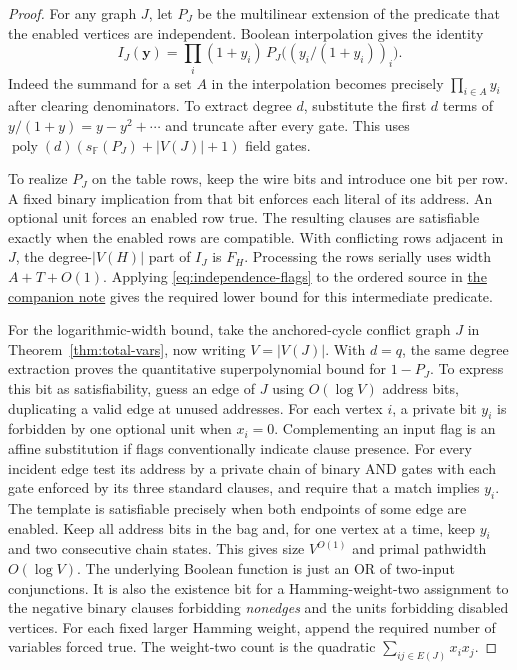 \documentclass[11pt]{article}
\theoremstyle{definition}
\newcommand{\F}{\mathbb F}
\begin{document}
\begin{proof}
For any graph \(J\), let \(P_J\) be the multilinear extension of the predicate that the enabled vertices are independent. Boolean interpolation gives the identity
\begin{equation}\label{eq:independence-flags}
 I_J(\mathbf y)=\prod_i(1+y_i)\,P_J\bigl((y_i/(1+y_i))_i\bigr).
\end{equation}
Indeed the summand for a set \(A\) in the interpolation becomes precisely \(\prod_{i\in A}y_i\) after clearing denominators. To extract degree \(d\), substitute the first \(d\) terms of \(y/(1+y)=y-y^2+\cdots\) and truncate after every gate. This uses \(\operatorname{poly}(d)(s_\F(P_J)+|V(J)|+1)\) field gates.

To realize \(P_J\) on the table rows, keep the wire bits and introduce one bit per row. A fixed binary implication from that bit enforces each literal of its address. An optional unit forces an enabled row true. The resulting clauses are satisfiable exactly when the enabled rows are compatible. With conflicting rows adjacent in \(J\), the degree-\(|V(H)|\) part of \(I_J\) is \(F_H\). Processing the rows serially uses width \(A+T+O(1)\). Applying \eqref{eq:independence-flags} to the ordered source in \href{sharper-additive-bound.md}{the companion note} gives the required lower bound for this intermediate predicate.

For the logarithmic-width bound, take the anchored-cycle conflict graph \(J\) in Theorem~\ref{thm:total-vars}, now writing \(V=|V(J)|\). With \(d=q\), the same degree extraction proves the quantitative superpolynomial bound for \(1-P_J\). To express this bit as satisfiability, guess an edge of \(J\) using \(O(\log V)\) address bits, duplicating a valid edge at unused addresses. For each vertex \(i\), a private bit \(y_i\) is forbidden by one optional unit when \(x_i=0\). Complementing an input flag is an affine substitution if flags conventionally indicate clause presence. For every incident edge test its address by a private chain of binary AND gates with each gate enforced by its three standard clauses, and require that a match implies \(y_i\). The template is satisfiable precisely when both endpoints of some edge are enabled. Keep all address bits in the bag and, for one vertex at a time, keep \(y_i\) and two consecutive chain states. This gives size \(V^{O(1)}\) and primal pathwidth \(O(\log V)\). The underlying Boolean function is just an OR of two-input conjunctions. It is also the existence bit for a Hamming-weight-two assignment to the negative binary clauses forbidding \emph{nonedges} and the units forbidding disabled vertices. For each fixed larger Hamming weight, append the required number of variables forced true. The weight-two count is the quadratic \(\sum_{ij\in E(J)}x_ix_j\).


\end{proof}
\end{document}
